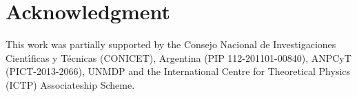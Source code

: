 \documentclass[manuscript, review, screen]{acmart}
\begin{document}
\maketitle

%

















\section*{Acknowledgment}
This work was partially  supported  by  the  Consejo  Nacional de
Investigaciones Cient\'{\i}ficas y T\'ecnicas (CONICET), Argentina
(PIP 112-201101-00840), ANPCyT (PICT-2013-2066), UNMDP and the International Centre for Theoretical Physics (ICTP) Associateship Scheme.\\



\end{document}
